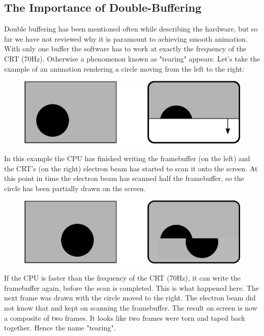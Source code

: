 \documentclass[book.tex]{subfiles}
\begin{document}
\subsection{The Importance of Double-Buffering}
Double buffering has been mentioned often while describing the hardware, but so far we have not reviewed why it is paramount to achieving smooth animation. With only one buffer the software has to work at exactly the frequency of the CRT (70Hz). Otherwise a phenomenon known as "tearing" appears. Let's take the example of an animation rendering a circle moving from the left to the right:
\par
\begin{figure}[H]
\centering
\includegraphics[width=\textwidth]{imgs/drawings/doublebuffer_before.eps}
\end{figure}
\par
In this example the CPU has finished writing the framebuffer (on the left) and the CRT's (on the right) electron beam has started to scan it onto the screen. At this point in time the electron beam has scanned half the framebuffer, so the circle has been partially drawn on the screen.
\par
\begin{figure}[H]
\centering
\includegraphics[width=\textwidth]{imgs/drawings/doublebuffer_after.eps}
\end{figure}
\par
If the CPU is faster than the frequency of the CRT (70Hz), it can write the framebuffer again, before the scan is completed. This is what happened here. The next frame was drawn with the circle moved to the right. The electron beam did not know that and kept on scanning the framebuffer. The result on screen is now a composite of two frames. It looks like two frames were torn and taped back together. Hence the name "tearing".\\
\end{document}
